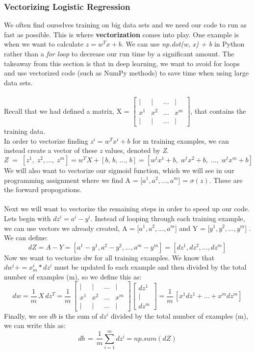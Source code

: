 \documentclass[11pt, a4paper]{article}
\begin{document}
\begin{spacing}{1.1}
	\subsubsection{Vectorizing Logistic Regression}
	We often find ourselves training on big data sets and we need our code to run as fast as possible. This is where \textbf{vectorization} comes into play. One example is when we want to calculate $ z = w^Tx + b$. We can use \textit{np.dot(w, x) + b} in Python rather than a \textit{for loop} to decrease our run time by a significant amount. The takeaway from this section is that in deep learning, we want to avoid for loops and use vectorized code (such as NumPy methods) to save time when using large data sets. \\~\\
	Recall that we had defined a matrix, X = $\begin{bmatrix} | & | & ... & | \\ x^1 & x^2 & ... & x^m \\ | & | & ... & | \end{bmatrix}$, that contains the training data. \vspace*{1mm}\\ In order to vectorize finding $ z^i = w^Tx^i + b$ for m training examples, we can instead create a vector of these \textit{z} values, denoted by \textit{Z}.  $$ Z\; =\; [z^1,\; z^2,...,\; z^m] = w^TX + [b,\, b,\,...,\,b] = [w^tx^1+b,\; w^tx^2+b,\;...,\; w^tx^m+b]$$ 
	We will also want to vectorize our sigmoid function, which we will see in our programming assignment where we find A = [$a^1, a^2,..., a^m$] = $\sigma(z)$. These are the forward propogations. \\~\\
	Next we will want to vectorize the remaining steps in order to speed up our code. Lets begin with $dz^i = a^i - y^i$. Instead of looping through each training example, we can use vectors we already created, A = [$a^1, a^2,..., a^m$]  and Y = [$y^1, y^2,..., y^m$] . We can define: $$ dZ = A - Y = [a^1-y^1, a^2-y^2,..., a^m-y^m] = [dz^1, dz^2, ..., dz^m] $$ Now we want to vectorize dw for all training examples. We know that $dw^i += x^i_m*dz^i$ must be updated fo each example and then divided by the total number of examples (m), so we define this as: $$ dw = \frac{1}{m}\,X\, dz^T = \frac{1}{m}\, \begin{bmatrix} | & | & ... & | \\ x^1 & x^2 & ... & x^m \\ | & | & ... & | \end{bmatrix} \begin{bmatrix} dz^1\\ | \\ dz^m \end{bmatrix}  = \frac{1}{m}\, [x^1dz^1 + ... + x^m dz^m]$$ Finally, we see $db$ is the sum of $dz^i$ divided by the total number of examples (m), we can write this as: $$ db \, = \, \frac{1}{m} \sum_{i=1}^m dz^i = np.sum(dZ)$$

\end{spacing}
\end{document}
